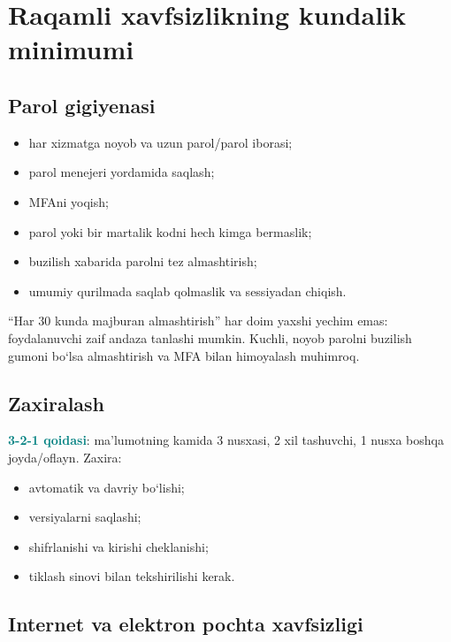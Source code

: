 \documentclass[11pt,a4paper,oneside]{book}
\newcommand{\keyterm}[1]{\textbf{\textcolor{Teal}{#1}}\index{#1}}
\begin{document}
\section{Raqamli xavfsizlikning kundalik minimumi}
\subsection{Parol gigiyenasi}

\begin{itemize}
  \item har xizmatga noyob va uzun parol/parol iborasi;
  \item parol menejeri yordamida saqlash;
  \item MFAni yoqish;
  \item parol yoki bir martalik kodni hech kimga bermaslik;
  \item buzilish xabarida parolni tez almashtirish;
  \item umumiy qurilmada saqlab qolmaslik va sessiyadan chiqish.
\end{itemize}

\begin{extra}
``Har 30 kunda majburan almashtirish'' har doim yaxshi yechim emas:
foydalanuvchi zaif andaza tanlashi mumkin. Kuchli, noyob parolni buzilish
gumoni bo‘lsa almashtirish va MFA bilan himoyalash muhimroq.
\end{extra}
\subsection{Zaxiralash}

\keyterm{3-2-1 qoidasi}: ma’lumotning kamida 3 nusxasi, 2 xil tashuvchi,
1 nusxa boshqa joyda/oflayn. Zaxira:

\begin{itemize}
  \item avtomatik va davriy bo‘lishi;
  \item versiyalarni saqlashi;
  \item shifrlanishi va kirishi cheklanishi;
  \item tiklash sinovi bilan tekshirilishi kerak.
\end{itemize}
\subsection{Internet va elektron pochta xavfsizligi}
\end{document}
